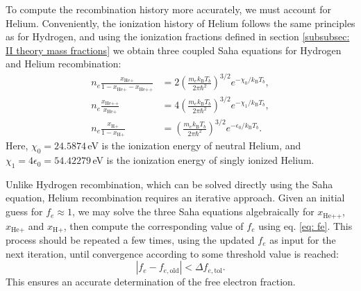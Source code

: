 \documentclass{aa}
\numberwithin{equation}{section}
\numberwithin{table}{section}
\numberwithin{figure}{section}
\begin{document}
To compute the recombination history more accurately, we must account for Helium. Conveniently, the ionization history of Helium follows the same principles as for Hydrogen,
and using the ionization fractions defined in section \ref{subsubsec: II theory mass fractions} we obtain three coupled Saha equations for Hydrogen and Helium recombination:
\begin{align}
n_e \frac{x_{\text{He+}}}{1 - x_{\text{He+}} - x_{\text{He++}}} &= 2 \left( \frac{m_e k_\text{B}T_b}{2\pi\hbar^2} \right)^{3/2} e^{-\chi_0 / k_\text{B}T_b}, \\
n_e \frac{x_{\text{He++}}}{x_{\text{He+}}} &= 4 \left( \frac{m_e k_\text{B}T_b}{2\pi\hbar^2} \right)^{3/2} e^{-\chi_1 / k_\text{B}T_b}, \\
n_e \frac{x_{\text{H+}}}{1 - x_{\text{H+}}} &= \left( \frac{m_e k_\text{B}T_b}{2\pi\hbar^2} \right)^{3/2} e^{-\epsilon_0 / k_\text{B}T_b}.
\end{align}
Here, $\chi_0 = 24.5874\,$eV is the ionization energy of neutral Helium, and $\chi_1 = 4\epsilon_0 = 54.42279\,$eV is the ionization energy of singly ionized Helium.



Unlike Hydrogen recombination, which can be solved directly using the Saha equation, Helium recombination requires an iterative approach. Given an initial guess for $ f_e \approx 1 $, we may solve the three Saha equations algebraically for $x_{\text{He++}}$, $x_{\text{He+}}$ and $x_{\text{H+}}$, then compute the corresponding value of $f_e$ using eq. \eqref{eq: fe}. This process should be repeated a few times, using the updated $f_e$ as input for the next iteration, until convergence according to some threshold value is reached:
\begin{equation}
  |f_e - f_{e,\text{old}} | < \Delta f_{e,\text{tol}}.
\end{equation}
This ensures an accurate determination of the free electron fraction.
\end{document}

